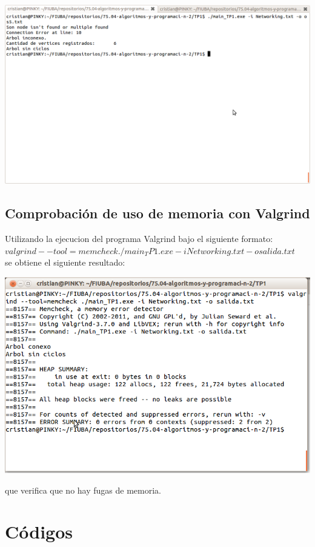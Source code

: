 \documentclass[10pt,a4paper]{article}
\begin{document}
\begin{center}
\includegraphics[scale=0.25]{Images/multiple nodos.png}\\
\end{center}
\subsection{Comprobación de uso de memoria con Valgrind}
Utilizando la ejecucion del programa Valgrind bajo el siguiente formato:\\
\texttt{$valgrind --tool=memcheck ./main_TP1.exe -i Networking.txt -o salida.txt$}\\
se obtiene el siguiente resultado:\\
\begin{center}
\includegraphics[scale=0.25]{Images/vagrind2.png}\\
\end{center}que verifica que no hay fugas de memoria.

\section{Códigos}
\end{document}
